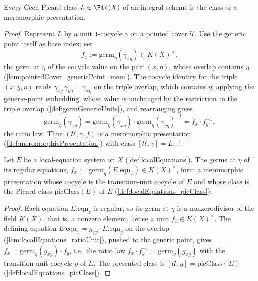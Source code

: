 \begin{theorem}
  \label{thm:exists_meromorphicPresentation}
  \leanok
  Every \v Cech Picard class \(L \in \Pic(X)\) of an integral scheme is the class of a meromorphic
  presentation.
\end{theorem}
\begin{proof}
  \leanok
  Represent \(L\) by a unit \(1\)-cocycle \(\gamma\) on a pointed cover \(\mathcal U\). Use the
  generic point itself as base index: set
  \[
    f_x := \mathrm{germ}_\eta(\gamma_{x\eta}) \in K(X)^{\times},
  \]
  the germ at \(\eta\) of the cocycle value on the pair \((x, \eta)\), whose overlap contains
  \(\eta\) (\ref{lem:pointedCover_genericPoint_mem}). The cocycle identity for the triple
  \((x, y, \eta)\) reads \(\gamma_{xy}\, \gamma_{y\eta} = \gamma_{x\eta}\) on the triple overlap,
  which contains \(\eta\); applying the generic-point embedding, whose value is unchanged by the
  restriction to the triple overlap (\ref{def:germGenericUnits}), and rearranging gives
  \[
    \mathrm{germ}_\eta(\gamma_{xy}) = \mathrm{germ}_\eta(\gamma_{x\eta}) \cdot
      \mathrm{germ}_\eta(\gamma_{y\eta})^{-1} = f_x \cdot f_y^{-1},
  \]
  the ratio law. Thus \((\mathcal U, \gamma, f)\) is a meromorphic presentation
  (\ref{def:meromorphicPresentation}) with class \([\mathcal U, \gamma] = L\).
\end{proof}

\begin{lemma}
  \label{lem:localEquations_presentation}
  \leanok
  Let \(E\) be a local-equation system on \(X\) (\ref{def:localEquations}). The germs at \(\eta\)
  of its regular equations, \(f_x := \mathrm{germ}_\eta(E.\mathrm{eqn}_x) \in K(X)^{\times}\), form
  a meromorphic presentation whose cocycle is the transition-unit cocycle of \(E\) and whose class
  is the Picard class \(\mathrm{picClass}(E)\) of \(E\) (\ref{def:localEquations_picClass}).
\end{lemma}
\begin{proof}
  \leanok
  Each equation \(E.\mathrm{eqn}_x\) is regular, so its germ at \(\eta\) is a nonzerodivisor of the
  field \(K(X)\), that is, a nonzero element, hence a unit \(f_x \in K(X)^{\times}\). The defining
  equation \(E.\mathrm{eqn}_x = g_{xy} \cdot E.\mathrm{eqn}_y\) on the overlap
  (\ref{lem:localEquations_ratioUnit}), pushed to the generic point, gives \(f_x = \mathrm{germ}_\eta(g_{xy}) \cdot f_y\),
  i.e.\ the ratio law \(f_x \cdot f_y^{-1} = \mathrm{germ}_\eta(g_{xy})\) with the transition-unit
  cocycle \(g\) of \(E\). The presented class is \([\mathcal U, g] = \mathrm{picClass}(E)\)
  (\ref{def:localEquations_picClass}).
\end{proof}

